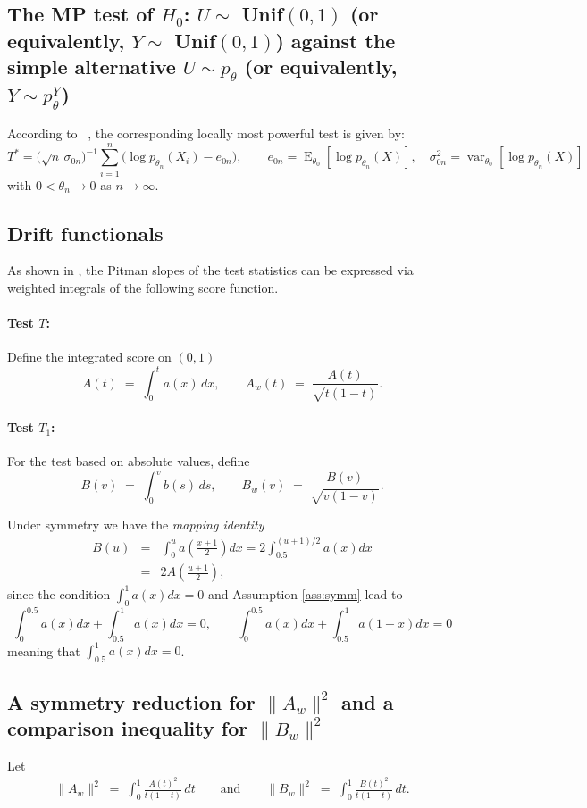\documentclass[12pt]{article}
\theoremstyle{remark}
\theoremstyle{plain}
\begin{document}
\subsection{The MP test of $H_0$: $U\sim$ Unif$(0,1)$ (or equivalently, $Y\sim$ Unif$(0,1)$)
	against the simple alternative $U\sim p_{\theta}$ (or equivalently,  $Y\sim p^Y_{\theta}$)}
According to ~\citet[p. 224]{inglot2000vanishing}, the corresponding locally most powerful test is given by:
\[
T^{\ast}
= \bigl(\sqrt{n}\,\sigma_{0n}\bigr)^{-1}
\sum_{i=1}^n \bigl(\log p_{\theta_n}(X_i) - e_{0n}\bigr),
\qquad
e_{0n} = \operatorname{E}_{\theta_0}\!\left[\log p_{\theta_n}(X)\right],
\quad
\sigma_{0n}^2 = \operatorname{var}_{\theta_0}\!\left[\log p_{\theta_n}(X)\right]
\]
with $0<\theta_n\to 0$ as $n\to \infty$.

\subsection{Drift functionals}
\label{ssec:functionals}
As shown in \citet{inglot2000vanishing}, the Pitman slopes of the test statistics can be expressed via weighted integrals of the following score function.

\paragraph{Test $T$:} Define the integrated score on $(0,1)$
\[
A(t) \;=\; \int_0^t a(x)\,dx, \qquad 
A_w(t) \;=\; \frac{A(t)}{\sqrt{t(1-t)}}.
\]
\paragraph{Test $T_1$:} For the test based on absolute values, define
\[
B(v) \;=\; \int_0^v b(s)\,ds, \qquad 
B_w(v) \;=\; \frac{B(v)}{\sqrt{v(1-v)}}.
\]


Under symmetry we have the \emph{mapping identity}
\begin{eqnarray}\nonumber
	B(u)&=&\int_{0}^{u} a\left(\frac{x+1}{2}\right)dx=2\int_{0.5}^{(u+1)/2} a\left(x\right)dx	
	\\
	&=&2A\left(\frac{u+1}{2}\right),
	\label{Eq1}
\end{eqnarray}
since 
the condition 
\(\int_{0}^1a(x)dx=0\) and Assumption \ref{ass:symm} lead to 
\[\int_{0}^{0.5}a(x)dx+\int_{0.5}^{1}a(x)dx=0, \qquad 
\int_{0}^{0.5}a(x)dx+\int_{0.5}^{1}a(1-x)dx=0
\]
meaning that \(\int_{0.5}^1a(x)dx=0\).

\subsection{A symmetry reduction for $\|A_w\|^2$ and a comparison inequality for $\|B_w\|^2$}
Let 
\begin{eqnarray*}\nonumber
	\|A_w\|^2 \;=\; \int_0^1 \frac{A(t)^2}{t(1-t)}\,dt \qquad\mbox{and}\qquad
	\|B_w\|^2 \;=\; \int_0^1 \frac{B(t)^2}{t(1-t)}\,dt.
\end{eqnarray*}
\end{document}
